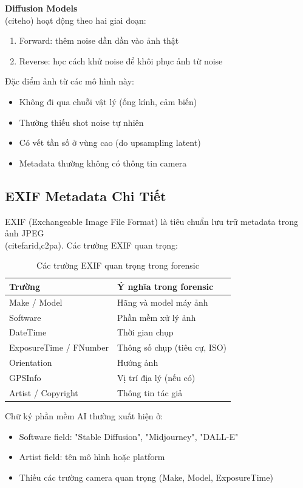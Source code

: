 \documentclass[14pt,a4paper,oneside]{report}
\begin{document}
\textbf{Diffusion Models} \\(cite{ho}) hoạt động theo hai giai đoạn:
\begin{enumerate}
  \item Forward: thêm noise dần dần vào ảnh thật
  \item Reverse: học cách khử noise để khôi phục ảnh từ noise
\end{enumerate}

Đặc điểm ảnh từ các mô hình này:
\begin{itemize}
  \item Không đi qua chuỗi vật lý (ống kính, cảm biến)
  \item Thường thiếu shot noise tự nhiên
  \item Có vết tần số ở vùng cao (do upsampling latent)
  \item Metadata thường không có thông tin camera
\end{itemize}

\subsection{EXIF Metadata Chi Tiết}
EXIF (Exchangeable Image File Format) là tiêu chuẩn lưu trữ metadata trong ảnh JPEG \\(cite{farid,c2pa}). Các trường EXIF quan trọng:

\begin{table}[H]
\centering
\caption{Các trường EXIF quan trọng trong forensic}
\label{tab:exif-fields}
\begin{tabularx}{\textwidth}{p{}Y}
\toprule
\textbf{Trường} & \textbf{Ý nghĩa trong forensic} \\
\midrule
Make / Model & Hãng và model máy ảnh \\
Software & Phần mềm xử lý ảnh \\
DateTime & Thời gian chụp \\
ExposureTime / FNumber & Thông số chụp (tiêu cự, ISO) \\
Orientation & Hướng ảnh \\
GPSInfo & Vị trí địa lý (nếu có) \\
Artist / Copyright & Thông tin tác giả \\
\bottomrule
\end{tabularx}
\end{table}

Chữ ký phần mềm AI thường xuất hiện ở:
\begin{itemize}
  \item Software field: "Stable Diffusion", "Midjourney", "DALL-E"
  \item Artist field: tên mô hình hoặc platform
  \item Thiếu các trường camera quan trọng (Make, Model, ExposureTime)
\end{itemize}
\end{document}
